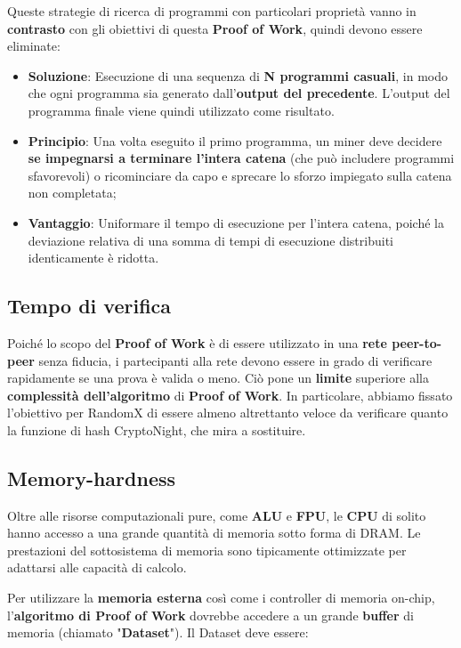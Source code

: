 Queste strategie di ricerca di programmi con particolari proprietà vanno in \textbf{contrasto} con gli obiettivi di questa \textbf{Proof of Work}, quindi devono essere eliminate:
\begin{itemize}
    \item \textbf{Soluzione}: Esecuzione di una sequenza di \textbf{N programmi casuali}, in modo che ogni programma sia generato dall'\textbf{output del precedente}. L'output del programma finale viene quindi utilizzato come risultato.
    \item \textbf{Principio}: Una volta eseguito il primo programma, un miner deve decidere \textbf{se impegnarsi a terminare l'intera catena} (che può includere programmi sfavorevoli) o ricominciare da capo e sprecare lo sforzo impiegato sulla catena non completata;
    \item \textbf{Vantaggio}: Uniformare il tempo di esecuzione per l'intera catena, poiché la deviazione relativa di una somma di tempi di esecuzione distribuiti identicamente è ridotta.
\end{itemize}

\subsection{Tempo di verifica}
Poiché lo scopo del \textbf{Proof of Work} è di essere utilizzato in una \textbf{rete peer-to-peer} senza fiducia, i partecipanti alla rete devono essere in grado di verificare rapidamente se una prova è valida o meno. Ciò pone un \textbf{limite} superiore alla \textbf{complessità dell'algoritmo} di \textbf{Proof of Work}. In particolare, abbiamo fissato l'obiettivo per RandomX di essere almeno altrettanto veloce da verificare quanto la funzione di hash CryptoNight, che mira a sostituire.

\subsection{Memory-hardness}
Oltre alle risorse computazionali pure, come \textbf{ALU} e \textbf{FPU}, le \textbf{CPU} di solito hanno accesso a una grande quantità di memoria sotto forma di DRAM. Le prestazioni del sottosistema di memoria sono tipicamente ottimizzate per adattarsi alle capacità di calcolo.

Per utilizzare la \textbf{memoria esterna} così come i controller di memoria on-chip, l'\textbf{algoritmo di Proof of Work} dovrebbe accedere a un grande \textbf{buffer} di memoria (chiamato "\textbf{Dataset}"). Il Dataset deve essere:

